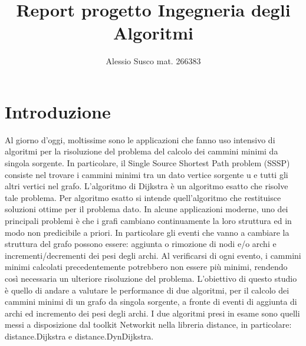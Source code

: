 \documentclass[a4paper]{article}
\begin{document}
\author{Alessio Susco mat. 266383}
\title{Report progetto Ingegneria degli Algoritmi}
\maketitle
\theoremstyle{definition}
\newtheorem{definition}{Definition}[section]
\newtheorem{theorem}{Theorem}
\section{Introduzione}
Al giorno d'oggi, moltissime sono le applicazioni che fanno uso intensivo di algoritmi per la risoluzione del problema del calcolo dei cammini minimi da singola sorgente.
In particolare, il Single Source Shortest Path problem (SSSP) consiste nel trovare i cammini minimi tra un dato vertice sorgente u e tutti gli altri vertici nel grafo.
L'algoritmo di Dijkstra è un algoritmo esatto che risolve tale problema. Per algoritmo esatto si intende quell'algoritmo che restituisce soluzioni ottime per il problema dato.
In alcune applicazioni moderne, uno dei principali problemi è che i grafi cambiano continuamente la loro struttura ed in modo non predicibile a priori. In particolare gli eventi che vanno a cambiare la struttura del grafo possono essere: aggiunta o rimozione di nodi e/o archi e incrementi/decrementi dei pesi degli archi. Al verificarsi di ogni evento, i cammini minimi calcolati precedentemente potrebbero non essere più minimi, rendendo così necessaria un ulteriore risoluzione del problema.
L'obiettivo di questo studio è quello di andare a valutare le performance di due algoritmi, per il calcolo dei cammini minimi di un grafo da singola sorgente, a fronte di eventi di aggiunta di archi ed incremento dei pesi degli archi.
I due algoritmi presi in esame sono quelli messi a disposizione dal toolkit Networkit nella libreria distance, in particolare: distance.Dijkstra e distance.DynDijkstra.
\end{document}
